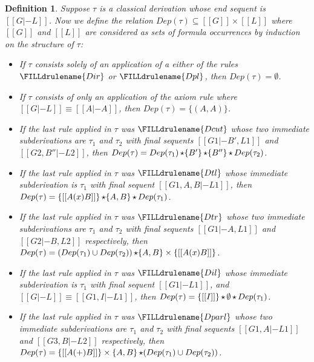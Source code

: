 \documentclass{article}
\newtheorem{definition}[theorem]{Definition}
\begin{document}
\begin{definition}
  \label{def:dep-dep-rel}
  Suppose $\tau$ is a classical derivation whose end sequent is $[[G
  |- L]]$.  Now we define the relation $Dep(\tau) \subseteq [[G]]
  \times [[L]]$ where $[[G]]$ and $[[L]]$ are considered as sets of
  formula occurrences by induction on the structure of $\tau$:
  \begin{itemize}
  \item[Case.] If $\tau$ consists solely of an application of a either of the rules
    $\FILLdrulename{Dir}$ or $\FILLdrulename{Dpl}$, then $Dep(\tau) =
    \emptyset$.  

  \item[Case.] If $\tau$ consists of only an application of the axiom
    rule where $[[G |- L]] \equiv [[A |- A]]$, then $Dep(\tau) =
    \{(A,A)\}$.

    
  \item[Case.] If the last rule applied in $\tau$ was
    $\FILLdrulename{Dcut}$ whose two immediate subderivations are
    $\tau_1$ and $\tau_2$ with final sequents $[[G1 |- B', L1]]$ and
    $[[G2, B'' |- L2]]$, then $Dep(\tau) = Dep(\tau_1) \mathop{\star} \{B'\}
    \mathop{\star} \{B''\} \mathop{\star} Dep(\tau_2)$.

  \item[Case.] If the last rule applied in $\tau$ was
    $\FILLdrulename{Dtl}$ whose immediate subderivation is
    $\tau_1$ with final sequent $[[G1,A,B |- L1]]$, 
    then 
    $Dep(\tau) = \{[[A (x) B]]\} \mathop{\star} \{A,B\} \mathop{\star} Dep(\tau_1)$.

  \item[Case.] If the last rule applied in $\tau$ was
    $\FILLdrulename{Dtr}$ whose two immediate subderivations are
    $\tau_1$ and $\tau_2$ with final sequents $[[G1 |- A,L1]]$ and
    $[[G2 |- B,L2]]$ respectively, then 
    $Dep(\tau) = (Dep(\tau_1) \cup Dep(\tau_2)) \mathop{\star} \{A,B\} \times
    \{[[A (x) B]]\}$.

  \item[Case.] If the last rule applied in $\tau$ was
    $\FILLdrulename{Dil}$ whose immediate subderivation is
    $\tau_1$ with final sequent $[[G1 |- L1]]$, and $[[G |- L]] \equiv
    [[G1,I |- L1]]$, 
    then 
    $Dep(\tau) = \{[[I]]\} \mathop{\star} \emptyset \mathop{\star} Dep(\tau_1)$.

  \item[Case.] If the last rule applied in $\tau$ was
    $\FILLdrulename{Dparl}$ whose two immediate subderivations are
    $\tau_1$ and $\tau_2$ with final sequents $[[G1, A |- L1]]$ and
    $[[G3, B |- L2]]$ respectively, then 
    $Dep(\tau) = \{[[A (+) B]]\} \times \{A,B\} \mathop{\star} (Dep(\tau_1) \cup
    Dep(\tau_2))$.


\end{itemize}
\end{definition}
\end{document}
